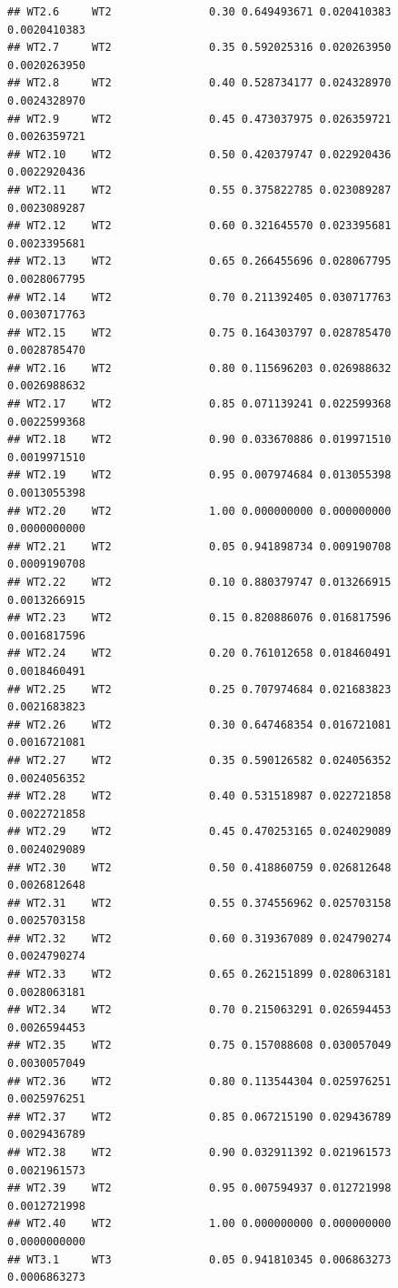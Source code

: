 \documentclass[
]{book}
\begin{document}
\begin{verbatim}
## WT2.6     WT2               0.30 0.649493671 0.020410383 0.0020410383
## WT2.7     WT2               0.35 0.592025316 0.020263950 0.0020263950
## WT2.8     WT2               0.40 0.528734177 0.024328970 0.0024328970
## WT2.9     WT2               0.45 0.473037975 0.026359721 0.0026359721
## WT2.10    WT2               0.50 0.420379747 0.022920436 0.0022920436
## WT2.11    WT2               0.55 0.375822785 0.023089287 0.0023089287
## WT2.12    WT2               0.60 0.321645570 0.023395681 0.0023395681
## WT2.13    WT2               0.65 0.266455696 0.028067795 0.0028067795
## WT2.14    WT2               0.70 0.211392405 0.030717763 0.0030717763
## WT2.15    WT2               0.75 0.164303797 0.028785470 0.0028785470
## WT2.16    WT2               0.80 0.115696203 0.026988632 0.0026988632
## WT2.17    WT2               0.85 0.071139241 0.022599368 0.0022599368
## WT2.18    WT2               0.90 0.033670886 0.019971510 0.0019971510
## WT2.19    WT2               0.95 0.007974684 0.013055398 0.0013055398
## WT2.20    WT2               1.00 0.000000000 0.000000000 0.0000000000
## WT2.21    WT2               0.05 0.941898734 0.009190708 0.0009190708
## WT2.22    WT2               0.10 0.880379747 0.013266915 0.0013266915
## WT2.23    WT2               0.15 0.820886076 0.016817596 0.0016817596
## WT2.24    WT2               0.20 0.761012658 0.018460491 0.0018460491
## WT2.25    WT2               0.25 0.707974684 0.021683823 0.0021683823
## WT2.26    WT2               0.30 0.647468354 0.016721081 0.0016721081
## WT2.27    WT2               0.35 0.590126582 0.024056352 0.0024056352
## WT2.28    WT2               0.40 0.531518987 0.022721858 0.0022721858
## WT2.29    WT2               0.45 0.470253165 0.024029089 0.0024029089
## WT2.30    WT2               0.50 0.418860759 0.026812648 0.0026812648
## WT2.31    WT2               0.55 0.374556962 0.025703158 0.0025703158
## WT2.32    WT2               0.60 0.319367089 0.024790274 0.0024790274
## WT2.33    WT2               0.65 0.262151899 0.028063181 0.0028063181
## WT2.34    WT2               0.70 0.215063291 0.026594453 0.0026594453
## WT2.35    WT2               0.75 0.157088608 0.030057049 0.0030057049
## WT2.36    WT2               0.80 0.113544304 0.025976251 0.0025976251
## WT2.37    WT2               0.85 0.067215190 0.029436789 0.0029436789
## WT2.38    WT2               0.90 0.032911392 0.021961573 0.0021961573
## WT2.39    WT2               0.95 0.007594937 0.012721998 0.0012721998
## WT2.40    WT2               1.00 0.000000000 0.000000000 0.0000000000
## WT3.1     WT3               0.05 0.941810345 0.006863273 0.0006863273

\end{verbatim}
\end{document}
